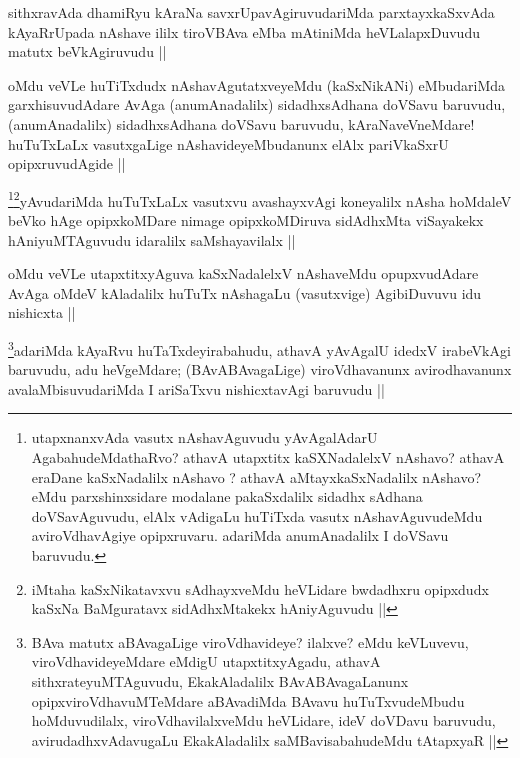 \begin{artha}
sithxravAda dhamiRyu kAraNa savxrUpavAgiruvudariMda parxtayxkaSxvAda kAyaRrUpada nAshave ililx tiroVBAva eMba mAtiniMda heVLalapxDuvudu matutx beVkAgiruvudu ||
\end{artha}

\begin{artha}
oMdu veVLe huTiTxdudx nAshavAgutatxveyeMdu (kaSxNikANi) eMbudariMda garxhisuvudAdare AvAga (anumAnadalilx) sidadhxsAdhana doVSavu baruvudu, (anumAnadalilx) sidadhxsAdhana doVSavu baruvudu, kAraNaveVneMdare! huTuTxLaLx vasutxgaLige nAshavideyeMbudanunx elAlx pariVkaSxrU opipxruvudAgide ||
\end{artha}

\begin{artha}
\footnote{utapxnanxvAda vasutx nAshavAguvudu yAvAgalAdarU AgabahudeMdathaRvo? athavA utapxtitx kaSXNadalelxV nAshavo? athavA eraDane kaSxNadalilx nAshavo
? athavA aMtayxkaSxNadalilx nAshavo? eMdu parxshinxsidare modalane pakaSxdalilx sidadhx sAdhana doVSavAguvudu, elAlx vAdigaLu huTiTxda vasutx nAshavAguvudeMdu aviroVdhavAgiye opipxruvaru. adariMda anumAnadalilx I doVSavu baruvudu.}\footnote{iMtaha kaSxNikatavxvu sAdhayxveMdu heVLidare bwdadhxru opipxdudx kaSxNa BaMguratavx sidAdhxMtakekx hAniyAguvudu ||}yAvudariMda huTuTxLaLx vasutxvu avashayxvAgi koneyalilx nAsha hoMdaleV beVko hAge opipxkoMDare nimage opipxkoMDiruva sidAdhxMta viSayakekx hAniyuMTAguvudu idaralilx saMshayavilalx ||  
\end{artha}

\begin{artha}
oMdu veVLe utapxtitxyAguva kaSxNadalelxV nAshaveMdu opupxvudAdare AvAga oMdeV kAladalilx huTuTx nAshagaLu (vasutxvige) AgibiDuvuvu idu nishicxta ||
\end{artha}

\begin{artha}
\footnote{BAva matutx aBAvagaLige viroVdhavideye? ilalxve? eMdu keVLuvevu, viroVdhavideyeMdare eMdigU utapxtitxyAgadu, athavA sithxrateyuMTAguvudu, EkakAladalilx BAvABAvagaLanunx opipxviroVdhavuMTeMdare aBAvadiMda BAvavu huTuTxvudeMbudu hoMduvudilalx, viroVdhavilalxveMdu heVLidare, ideV doVDavu baruvudu, avirudadhxvAdavugaLu EkakAladalilx saMBavisabahudeMdu tAtapxyaR ||}adariMda kAyaRvu huTaTxdeyirabahudu, athavA yAvAgalU idedxV irabeVkAgi baruvudu, adu heVgeMdare; (BAvABAvagaLige) viroVdhavanunx avirodhavanunx avalaMbisuvudariMda I ariSaTxvu nishicxtavAgi baruvudu ||
\end{artha}

